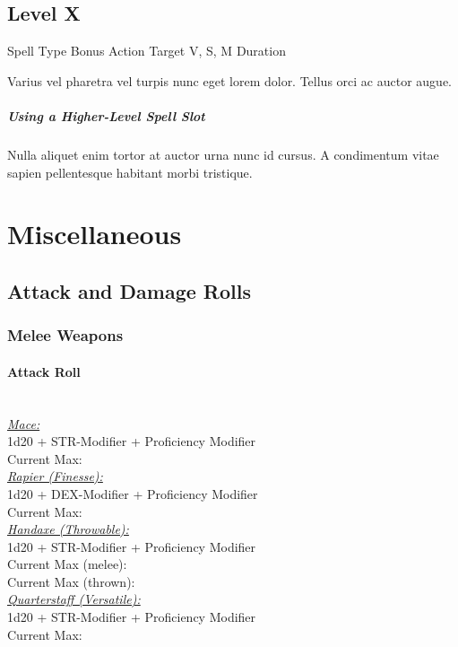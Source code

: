 \documentclass[letterpaper,openany,oneside,twocolumn]{book}
\begin{document}
\subsection*{Level X}

	{Spell Type}
	{Bonus Action}
	{Target}
	{V, S, M}
	{Duration}

Varius vel pharetra vel turpis nunc eget lorem dolor. Tellus orci ac auctor augue.

\subparagraph*{Using a Higher-Level Spell Slot} Nulla aliquet enim tortor at auctor urna nunc id cursus. A condimentum vitae sapien pellentesque habitant morbi tristique.

\vfill\eject
\section*{Miscellaneous}
\subsection*{Attack and Damage Rolls}
\subsubsection*{Melee Weapons}
\paragraph*{Attack Roll}\hfill\\
\underline{\textit{Mace:}}\\
1d20 + STR-Modifier + Proficiency Modifier\\
\indent Current Max: 
\\
\underline{\textit{Rapier (Finesse):}}\\
1d20 + DEX-Modifier + Proficiency Modifier\\
\indent Current Max: 
\\
\underline{\textit{Handaxe (Throwable):}}\\
1d20 + STR-Modifier + Proficiency Modifier\\
\indent Current Max (melee): \\
\indent Current Max (thrown): 
\\
\underline{\textit{Quarterstaff (Versatile):}}\\
1d20 + STR-Modifier + Proficiency Modifier\\
\indent Current Max: 
\end{document}
